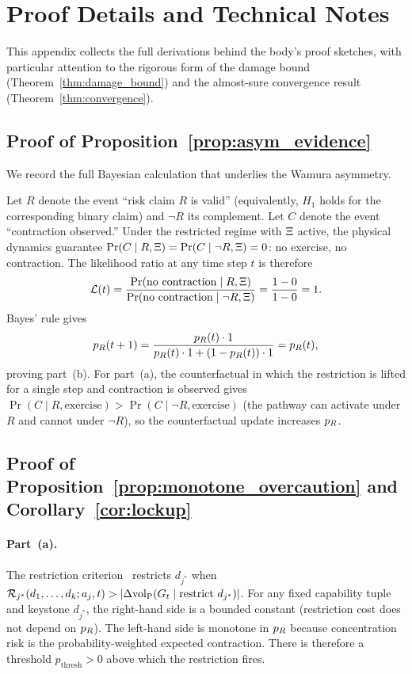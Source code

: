 \section{Proof Details and Technical Notes}
\label{app:proofs}

This appendix collects the full derivations behind the body's
proof sketches, with particular attention to the rigorous form
of the damage bound (Theorem~\ref{thm:damage_bound}) and the
almost-sure convergence result (Theorem~\ref{thm:convergence}).

\subsection{Proof of Proposition~\ref{prop:asym_evidence}}
\label{app:proof_asym_evidence}

We record the full Bayesian calculation that underlies the
Wamura asymmetry.

Let $R$ denote the event ``risk claim $R$ is valid''
(equivalently, $H_1$ holds for the corresponding binary claim)
and $\neg R$ its complement.  Let $C$ denote the event
``contraction observed.''  Under the restricted regime with
$\Xi$ active, the physical dynamics guarantee
$\Pr(C \mid R, \Xi) = \Pr(C \mid \neg R, \Xi)
= 0$: no exercise, no contraction.  The likelihood ratio at any
time step $t$ is therefore
$$
\mathcal{L}(t) =
  \frac{\Pr(\text{no contraction} \mid R, \Xi)}
       {\Pr(\text{no contraction} \mid \neg R, \Xi)}
  = \frac{1 - 0}{1 - 0} = 1.
$$
Bayes' rule gives
$$
p_R(t+1) = \frac{p_R(t) \cdot 1}
                {p_R(t) \cdot 1 + (1 - p_R(t)) \cdot 1}
        = p_R(t),
$$
proving part~(b).  For part~(a), the counterfactual in which
the restriction is lifted for a single step and contraction is
observed gives
$\Pr(C \mid R, \text{exercise}) > \Pr(C \mid \neg R,
\text{exercise})$ (the pathway can activate under $R$ and
cannot under $\neg R$), so the counterfactual update
increases $p_R$.

\subsection{Proof of Proposition~\ref{prop:monotone_overcaution}
and Corollary~\ref{cor:lockup}}

\paragraph{Part~(a).}
The restriction
criterion~\citep[Proposition~1]{lasser2026horizon} restricts
$d_{j^*}$ when
$\mathcal{R}_{j^*}(d_1, \ldots, d_k; a_j, t) >
|\Delta {\operatorname{vol}_{\mathrm{P}}}(G_t \mid \text{restrict } d_{j^*})|$.
For any fixed capability tuple and keystone $d_{j^*}$, the
right-hand side is a bounded constant (restriction cost does
not depend on $p_R$).  The left-hand side is monotone in
$p_R$ because concentration risk is the probability-weighted
expected contraction.  There is therefore a threshold
$p_{\mathrm{thresh}} > 0$ above which the restriction fires.

